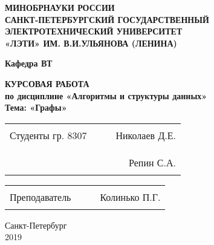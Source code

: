 \begin{titlepage}
\begin{center}
    \uppercase{\textbf{Минобрнауки России\\
            Санкт-Петербургский государственный\\
            электротехнический университет\\
            «ЛЭТИ» им. В.И.Ульянова (Ленина)
    }}
    \vspace{0.25cm}

    \textbf{Кафедра ВТ}
    \vfill

    \uppercase{\textbf{\large{
        Курсовая работа
    }}}
    \\
    \textbf{\large{
      по дисциплине «Алгоритмы и структуры данных»\\
      Тема: «Графы»
    }}
  \bigskip
\end{center}
\vfill

\noindent
\begin{tabularx}{\textwidth}{@{}lcXr}
    Студенты гр. 8307 & \hspace{1.6cm} & \rule{5cm}{1pt} & Николаев Д.Е. \\
    \\
                      & \hspace{1.6cm} & \rule{5cm}{1pt} & Репин С.А.
\end{tabularx}

\vspace{0.5cm}

\noindent
\begin{tabularx}{\textwidth}{@{}lcXr}
    Преподаватель & \hspace{2.3cm} & \rule{5cm}{1pt} & Колинько П.Г.
\end{tabularx}

\hfill \break
\hfill \break

\begin{center}
  Санкт-Петербург\\2019
\end{center}

\end{titlepage}

